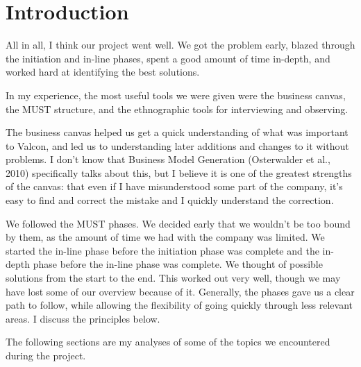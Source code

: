 \section*{Introduction}
All in all, I think our project went well.
We got the problem early, blazed through the initiation and in-line phases, spent a good amount of time in-depth, and worked hard at identifying the best solutions.

In my experience, the most useful tools we were given were the business canvas, the MUST structure, and the ethnographic tools for interviewing and observing.

The business canvas helped us get a quick understanding of what was important to Valcon, and led us to understanding later additions and changes to it without problems.
I don't know that Business Model Generation (Osterwalder et al., 2010) specifically talks about this, but I believe it is one of the greatest strengths of the canvas: that even if I have misunderstood some part of the company, it's easy to find and correct the mistake and I quickly understand the correction.

We followed the MUST phases.
We decided early that we wouldn't be too bound by them, as the amount of time we had with the company was limited.
We started the in-line phase before the initiation phase was complete and the in-depth phase before the in-line phase was complete.
We thought of possible solutions from the start to the end.
This worked out very well, though we may have lost some of our overview because of it.
Generally, the phases gave us a clear path to follow, while allowing the flexibility of going quickly through less relevant areas.
I discuss the principles below.

The following sections are my analyses of some of the topics we encountered during the project.